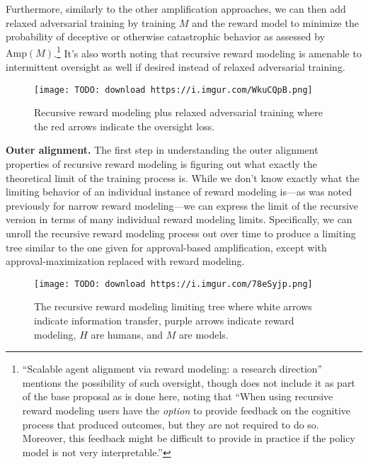 Furthermore, similarly to the other amplification approaches, we can then add relaxed adversarial training by training $M$ and the reward model to minimize the probability of deceptive\cite{TODO: cite https://www.alignmentforum.org/posts/zthDPAjh9w6Ytbeks/deceptive-alignment} or otherwise catastrophic\cite{TODO: cite https://ai-alignment.com/learning-with-catastrophes-59387b55cc30} behavior as assessed by $\text{Amp}(M)$.\footnote{``Scalable agent alignment via reward modeling: a research direction\cite{TODO: cite https://arxiv.org/abs/1811.07871}'' mentions the possibility of such oversight, though does not include it as part of the base proposal as is done here, noting that ``When using recursive reward modeling users have the \textit{option} to provide feedback on the cognitive process that produced outcomes, but they are not required to do so. Moreover, this feedback might be difficult to provide in practice if the policy model is not very interpretable.''} It's also worth noting that recursive reward modeling is amenable to intermittent oversight as well if desired instead of relaxed adversarial training.

\begin{figure}[h!]
  \centering
  \texttt{[image: TODO: download https://i.imgur.com/WkuCQpB.png]}
  \caption{Recursive reward modeling plus relaxed adversarial training where the red arrows indicate the oversight loss.}
\end{figure}

\textbf{Outer alignment.} The first step in understanding the outer alignment properties of recursive reward modeling is figuring out what exactly the theoretical limit of the training process is. While we don't know exactly what the limiting behavior of an individual instance of reward modeling is---as was noted previously for narrow reward modeling---we can express the limit of the recursive version in terms of many individual reward modeling limits. Specifically, we can unroll the recursive reward modeling process out over time to produce a limiting tree similar to the one given for approval-based amplification, except with approval-maximization replaced with reward modeling.

\begin{figure}[h!]
  \centering
  \texttt{[image: TODO: download https://i.imgur.com/78eSyjp.png]}
  \caption{The recursive reward modeling limiting tree where white arrows indicate information transfer, purple arrows indicate reward modeling, $H$ are humans, and $M$ are models.}
\end{figure}

